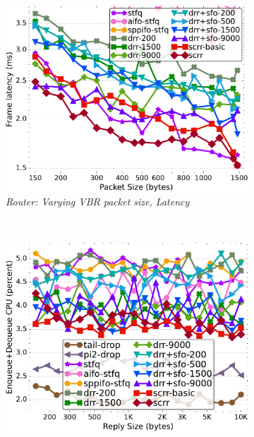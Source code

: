 \begin{figure}[th!]
\begin{subfigure}[t]{.30\linewidth}
  \end{subfigure}
  \begin{subfigure}[t]{.30\linewidth}
    \centering
    \includegraphics[width=0.95\linewidth]{figs/pkt_size_cn_2t4x16_mn_2ui32_mss_1468_lat_comp_drr_scrr.pdf}
    \caption{\small{\textit{Router: Varying VBR packet size, Latency}}}
    \label{fig:vbr-1456-latency-sched-full}
  \end{subfigure}
  \\
  \begin{subfigure}[t]{.30\linewidth}
    \centering
    \includegraphics[width=0.95\linewidth]{figs/pkt_size_cn_2t4x8_mn_2tb2x4_per_15_mss_1468_kp_comp_methods.pdf}

\end{subfigure}
\end{figure}

